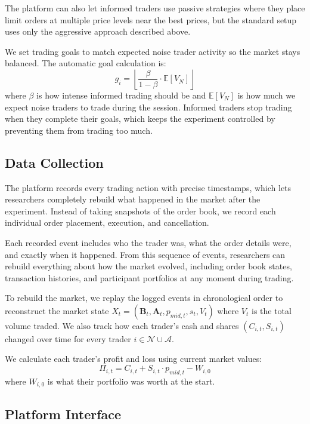 The platform can also let informed traders use passive strategies where they place limit orders at multiple price levels near the best prices, but the standard setup uses only the aggressive approach described above.

We set trading goals to match expected noise trader activity so the market stays balanced. The automatic goal calculation is:
\begin{equation}
g_i = \left\lfloor \frac{\beta}{1-\beta} \cdot \mathbb{E}[V_N] \right\rfloor
\end{equation}
where $\beta$ is how intense informed trading should be and $\mathbb{E}[V_N]$ is how much we expect noise traders to trade during the session. Informed traders stop trading when they complete their goals, which keeps the experiment controlled by preventing them from trading too much.

\subsection{Data Collection}

The platform records every trading action with precise timestamps, which lets researchers completely rebuild what happened in the market after the experiment. Instead of taking snapshots of the order book, we record each individual order placement, execution, and cancellation.

Each recorded event includes who the trader was, what the order details were, and exactly when it happened. From this sequence of events, researchers can rebuild everything about how the market evolved, including order book states, transaction histories, and participant portfolios at any moment during trading.

To rebuild the market, we replay the logged events in chronological order to reconstruct the market state $X_t = (\mathbf{B}_t, \mathbf{A}_t, p_{mid,t}, s_t, V_t)$ where $V_t$ is the total volume traded. We also track how each trader's cash and shares $(C_{i,t}, S_{i,t})$ changed over time for every trader $i \in \mathcal{N} \cup \mathcal{A}$. 

We calculate each trader's profit and loss using current market values:
\begin{equation}
\Pi_{i,t} = C_{i,t} + S_{i,t} \cdot p_{mid,t} - W_{i,0} \label{eq:pnl}
\end{equation}
where $W_{i,0}$ is what their portfolio was worth at the start.

\subsection{Platform Interface}
\label{sec:interface}

